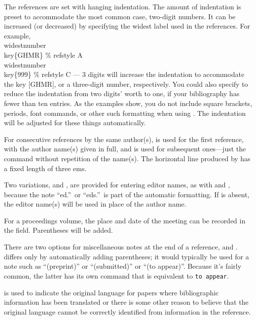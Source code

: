 The references are set with hanging indentation.  The amount of indentation
is preset to accommodate the most common case, two-digit numbers.
It can be increased (or decreased) by specifying the widest
label used in the references. For example,
\beginexample{}
\\widestnumber\\key\{GHMR\} \% refstyle A
\\widestnumber\\key\{999\} \% refstyle C --- 3 digits
\endexample
\noindent
will increase the indentation to accommodate the key \hbox{[GHMR]}, or a
three-digit number, respectively.   You could also specify
 to reduce the indentation from two digits'
worth to one, if your bibliography has fewer than ten entries. As the
examples show, you do not include square brackets, periods, font
commands, or other such formatting when using .  The 
indentation will be adjusted for these things automatically.

For consecutive references by the same author(s),   is used for
the first reference, with the author name(s) given in full, and
 is used for subsequent ones---just the command 
without repetition of the name(s). The horizontal line produced by
 has a fixed length of three ems.

Two variations,  and , are provided for entering editor
names, as with  and , because the note ``ed.''\ or
``eds.''\ is part of the automatic formatting.  If  is absent,
the editor name(s) will be used in place of the author name.

For a proceedings volume, the place and date of the meeting can
be recorded in the  field.  Parentheses will be
added.

There are two options for miscellaneous notes at the end of a reference,
 and .   differs only by
automatically adding parentheses; it would typically be used for
a note such as ``(preprint)'' or ``(submitted)'' or ``(to appear)''.
Because it's fairly common, the latter has its own command 
that is equivalent to  {\tt to appear}.

 is used to indicate the original language for papers where
bibliographic information has been translated or there is some other reason
to believe that the original language cannot be correctly identified from
information in the reference.

